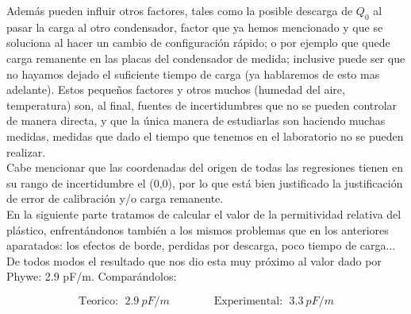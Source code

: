 \documentclass[12pt,a4paper]{article}
\begin{document}
Además pueden influir otros factores, tales como la posible descarga de $Q_0$ al pasar la carga al otro condensador, factor que ya hemos mencionado y que se soluciona al hacer un cambio de configuración rápido; o por ejemplo que quede carga remanente en las placas del condensador de medida; inclusive puede ser que no hayamos dejado el suficiente tiempo de carga (ya hablaremos de esto mas adelante). Estos pequeños factores y otros muchos (humedad del aire, temperatura) son, al final, fuentes de incertidumbres que no se pueden controlar de manera directa, y  que la única manera de estudiarlas son haciendo muchas medidas, medidas que dado el tiempo que tenemos en el laboratorio no se pueden realizar. \\

Cabe mencionar que las coordenadas del origen de todas las regresiones tienen en su rango de incertidumbre el (0,0), por lo que está bien justificado la justificación de error de calibración y/o carga remanente. \\



En la siguiente parte tratamos de calcular el valor de la permitividad relativa del plástico, enfrentándonos también a los mismos problemas que en los anteriores aparatados: los efectos de borde, perdidas por descarga, poco tiempo de carga... De todos modos el resultado que nos dio esta muy próximo al valor dado por Phywe: 2.9 pF/m. Comparándolos:

\begin{equation}
\mathrm{Teorico:} \ \ 2.9 \ pF/m \quad \quad \quad \quad \mathrm{Experimental:}  \ \ 3.3 \ pF/m
\end{equation}
\end{document}
